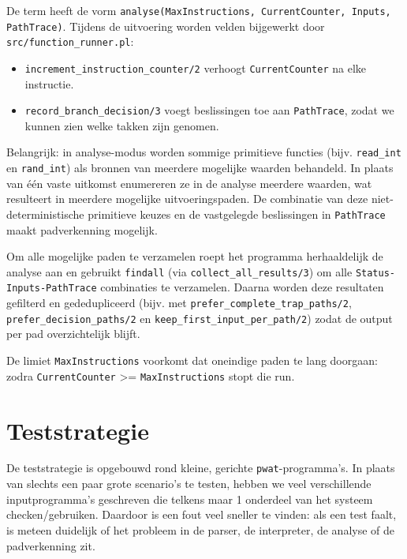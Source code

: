 \documentclass[a4paper,11pt]{article}
\begin{document}
De term heeft de vorm \texttt{analyse(MaxInstructions, CurrentCounter, Inputs, PathTrace)}. Tijdens de uitvoering worden velden bijgewerkt door \texttt{src/function\_runner.pl}:

\begin{itemize}
    \item \texttt{increment\_instruction\_counter/2} verhoogt \texttt{CurrentCounter} na elke instructie.
    \item \texttt{record\_branch\_decision/3} voegt beslissingen toe aan \texttt{PathTrace}, zodat we kunnen zien welke takken zijn genomen.
\end{itemize}

Belangrijk: in analyse-modus worden sommige primitieve functies (bijv. \texttt{read\_int} en \texttt{rand\_int}) als bronnen van meerdere mogelijke waarden behandeld. In plaats van één vaste uitkomst enumereren ze in de analyse meerdere waarden, wat resulteert in meerdere mogelijke uitvoeringspaden. De combinatie van deze niet-deterministische primitieve keuzes en de vastgelegde beslissingen in \texttt{PathTrace} maakt padverkenning mogelijk.

Om alle mogelijke paden te verzamelen roept het programma herhaaldelijk de analyse aan en gebruikt \texttt{findall} (via \texttt{collect\_all\_results/3}) om alle \texttt{Status-Inputs-PathTrace} combinaties te verzamelen. Daarna worden deze resultaten gefilterd en gededupliceerd (bijv. met \texttt{prefer\_complete\_trap\_paths/2}, \texttt{prefer\_decision\_paths/2} en \texttt{keep\_first\_input\_per\_path/2}) zodat de output per pad overzichtelijk blijft.

De limiet \texttt{MaxInstructions} voorkomt dat oneindige paden te lang doorgaan: zodra \texttt{CurrentCounter} \textgreater= \texttt{MaxInstructions} stopt die run.




\section{Teststrategie}

De teststrategie is opgebouwd rond kleine, gerichte \texttt{pwat}-programma's. In plaats van slechts een paar
grote scenario's te testen, hebben we veel verschillende inputprogramma's geschreven die telkens maar 1 onderdeel
van het systeem checken/gebruiken. Daardoor is een fout veel sneller te vinden: als een test faalt, is meteen duidelijk of het
probleem in de parser, de interpreter, de analyse of de padverkenning zit.
\end{document}
